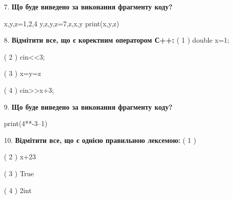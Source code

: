 \documentclass[11pt]{article}
\begin{document}
7. \textbf{Що буде виведено за виконання фрагменту коду?}

x,y,z=1,2,4
y,z,y,z=7,z,x,y
print(x,y,z)
\vspace{5mm}

8. %
\textbf{Відмітити все, що є коректним оператором С++:}
( 1 ) double x=1;

( 2 ) cin<<3;

( 3 ) x=y=z

( 4 ) cin>>x+3;
\vspace{5mm}

9. \textbf{Що буде виведено за виконання фрагменту коду?}

print(4**-3--1)
\vspace{5mm}

10. %
\textbf{Відмітити все, що є однією правильною лексемою:}
( 1 ) %

( 2 ) x+23

( 3 ) True

( 4 ) 2int
\vspace{5mm}

\newpage
\end{document}
